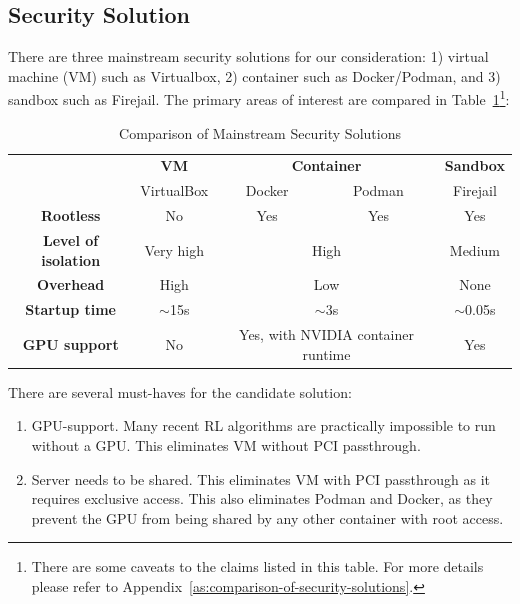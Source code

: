 \subsection{Security Solution}
There are three mainstream security solutions for our consideration: 1) virtual machine (VM) such as Virtualbox, 2) container such as Docker/Podman, and 3) sandbox such as Firejail. The primary areas of interest are compared in Table~\ref{tab:security-solutions}\footnote{There are some caveats to the claims listed in this table. For more details please refer to Appendix~\ref{as:comparison-of-security-solutions}.}:

\begin{table}[H]
\centering
\begin{tabular}{|c|c|cc|c|}
\hline
\multirow{2}{*}{} & \textbf{VM} & \multicolumn{2}{c|}{\textbf{Container}} & \textbf{Sandbox} \\ \cline{2-5} 
 & VirtualBox & \multicolumn{1}{c|}{Docker} & Podman & Firejail \\ \hline
\textbf{Rootless} & No & \multicolumn{1}{c|}{Yes} & Yes & Yes \\ \hline
\textbf{Level of isolation} & Very high & \multicolumn{2}{c|}{High} & Medium \\ \hline
\textbf{Overhead} & High & \multicolumn{2}{c|}{Low} & None \\ \hline
\textbf{Startup time} & $\sim$15s & \multicolumn{2}{c|}{$\sim$3s} & $\sim$0.05s \\ \hline
\textbf{GPU support} & No & \multicolumn{2}{c|}{Yes, with NVIDIA container runtime} & Yes \\ \hline
\end{tabular}
\caption{Comparison of Mainstream Security Solutions}
\label{tab:security-solutions}
\end{table}

There are several must-haves for the candidate solution:

\begin{enumerate}
    \item GPU-support. Many recent RL algorithms are practically impossible to run without a GPU. This eliminates VM without PCI passthrough.
    \item Server needs to be shared. This eliminates VM with PCI passthrough as it requires exclusive access. This also eliminates Podman and Docker, as they prevent the GPU from being shared by any other container with root access.
\end{enumerate}


